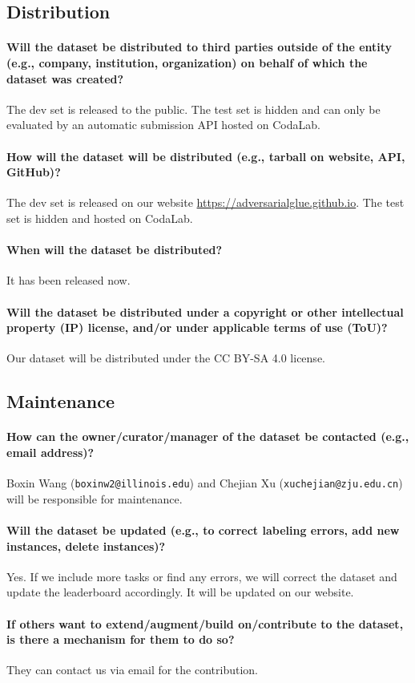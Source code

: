 \documentclass{article}
\begin{document}
\subsection{Distribution}

\paragraph{Will the dataset be distributed to third parties outside of the entity (e.g., company, institution, organization) on behalf of which the dataset was created?} The dev set is released to the public. The test set is hidden and can only be evaluated by an automatic submission API hosted on CodaLab.

\paragraph{How will the dataset will be distributed (e.g., tarball on website, API, GitHub)?} The dev set is released on our website \url{https://adversarialglue.github.io}. The test set is hidden and hosted on CodaLab.

\paragraph{When will the dataset be distributed?} It has been released now.

\paragraph{Will the dataset be distributed under a copyright or other intellectual property (IP) license, and/or under applicable terms of use (ToU)?} Our dataset will be distributed under the CC BY-SA 4.0 license.

\subsection{Maintenance}

\paragraph{How can the owner/curator/manager of the dataset be contacted (e.g., email address)?}

Boxin Wang (\texttt{boxinw2@illinois.edu}) and Chejian Xu (\texttt{xuchejian@zju.edu.cn}) will be responsible for maintenance.

\paragraph{Will the dataset be updated (e.g., to correct labeling errors, add new instances, delete instances)?}
Yes. If we include more tasks or find any errors, we will correct the dataset and update the leaderboard accordingly. It will be updated on our website.

\paragraph{If others want to extend/augment/build on/contribute to the dataset, is there a mechanism for them to do so?}
They can contact us via email for the contribution.
\end{document}
